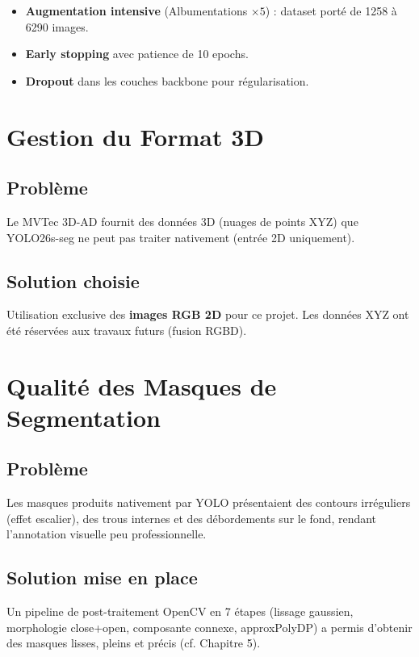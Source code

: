 \documentclass[12pt, a4paper]{report}
\begin{document}
\begin{itemize}
  \item \textbf{Augmentation intensive} (Albumentations $\times 5$) : dataset porté de 1258 à 6290 images.
  \item \textbf{Early stopping} avec patience de 10 epochs.
  \item \textbf{Dropout} dans les couches backbone pour régularisation.
\end{itemize}

\section{Gestion du Format 3D}

\subsection{Problème}

Le MVTec 3D-AD fournit des données 3D (nuages de points XYZ) que YOLO26s-seg ne peut pas traiter nativement (entrée 2D uniquement).

\subsection{Solution choisie}

Utilisation exclusive des \textbf{images RGB 2D} pour ce projet. Les données XYZ ont été réservées aux travaux futurs (fusion RGBD).

\section{Qualité des Masques de Segmentation}

\subsection{Problème}

Les masques produits nativement par YOLO présentaient des contours irréguliers (effet escalier), des trous internes et des débordements sur le fond, rendant l'annotation visuelle peu professionnelle.

\subsection{Solution mise en place}

Un pipeline de post-traitement OpenCV en 7 étapes (lissage gaussien, morphologie close+open, composante connexe, approxPolyDP) a permis d'obtenir des masques lisses, pleins et précis (cf. Chapitre 5).
\end{document}
